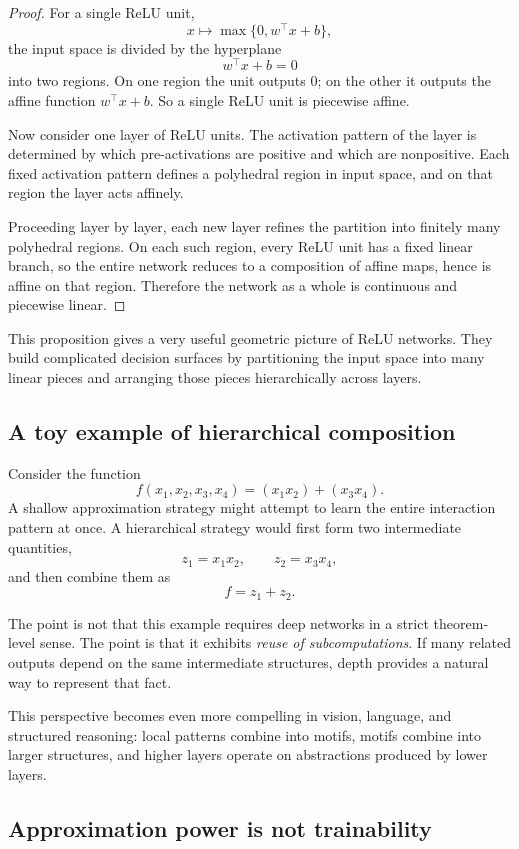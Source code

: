 \begin{proof}
For a single ReLU unit,
\[
x\mapsto \max\{0,w^\top x+b\},
\]
the input space is divided by the hyperplane
\[
w^\top x+b=0
\]
into two regions. On one region the unit outputs $0$; on the other it outputs the affine function $w^\top x+b$. So a single ReLU unit is piecewise affine.

Now consider one layer of ReLU units. The activation pattern of the layer is determined by which pre-activations are positive and which are nonpositive. Each fixed activation pattern defines a polyhedral region in input space, and on that region the layer acts affinely.

Proceeding layer by layer, each new layer refines the partition into finitely many polyhedral regions. On each such region, every ReLU unit has a fixed linear branch, so the entire network reduces to a composition of affine maps, hence is affine on that region. Therefore the network as a whole is continuous and piecewise linear.
\end{proof}

This proposition gives a very useful geometric picture of ReLU networks. They build complicated decision surfaces by partitioning the input space into many linear pieces and arranging those pieces hierarchically across layers.

\subsection*{A toy example of hierarchical composition}

Consider the function
\[
f(x_1,x_2,x_3,x_4)=(x_1x_2)+(x_3x_4).
\]
A shallow approximation strategy might attempt to learn the entire interaction pattern at once. A hierarchical strategy would first form two intermediate quantities,
\[
z_1=x_1x_2,
\qquad
z_2=x_3x_4,
\]
and then combine them as
\[
f=z_1+z_2.
\]

The point is not that this example requires deep networks in a strict theorem-level sense. The point is that it exhibits \emph{reuse of subcomputations}. If many related outputs depend on the same intermediate structures, depth provides a natural way to represent that fact.

This perspective becomes even more compelling in vision, language, and structured reasoning:
local patterns combine into motifs, motifs combine into larger structures, and higher layers operate on abstractions produced by lower layers.

\subsection*{Approximation power is not trainability}

